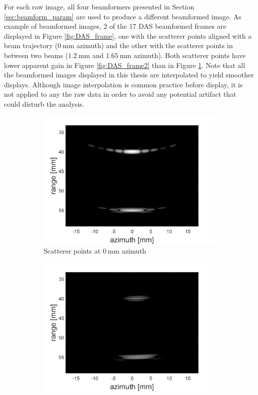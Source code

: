 For each raw image, all four beamformers presented in Section \ref{sec:beamform_param} are used to produce a different beamformed image. As example of beamformed images, 2 of the 17 DAS beamformed frames are displayed in Figure \ref{fig:DAS_frame}, one with the scatterer points aligned with a beam trajectory ($0~$mm azimuth) and the other with the scatterer points in between two beams ($1.2~$mm and $1.65~$mm azimuth). Both scatterer points have lower apparent gain in Figure \ref{fig:DAS_frame2} than in Figure \ref{fig:DAS_frame1}.
Note that all the beamformed images displayed in this thesis are interpolated to yield smoother displays.
Although image interpolation is common practice before display, it is not applied to any the raw data in order to avoid any potential artifact that could disturb the analysis.

\begin{figure}[ht]
    \centering
    \begin{subfigure}[t]{0.48\linewidth}
        \includegraphics[width=\linewidth]{./images/results/1/DAS_frame1.png}
        \caption{Scatterer points at $0~$mm azimuth}
        \label{fig:DAS_frame1}
    \end{subfigure}
    \quad
    \begin{subfigure}[t]{0.48\linewidth}
        \includegraphics[width=\linewidth]{./images/results/1/DAS_frame2.png}

\end{subfigure}
\end{figure}
